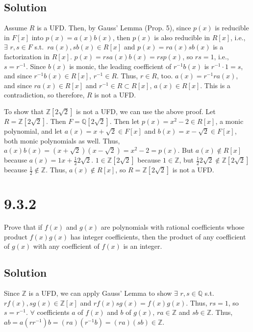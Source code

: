 \documentclass[fleqn]{article}
\begin{document}
        \subsection{Solution}
        Assume $R$ is a UFD.  Then, by Gauss' Lemma (Prop. 5), since $p(x)$ is reducible in $F[x]$ into $p(x) = a(x)b(x)$, then $p(x)$ is also reducible in $R[x]$, i.e., $\exists$ $r, s \in F$ s.t.\ $ra(x), sb(x) \in R[x]$ and $p(x) = ra(x) sb(x)$ is a factorization in $R[x]$.  $p(x) = rs a(x)b(x) = rs p(x)$, so $rs = 1$, i.e., $s = r^{-1}$.  Since $b(x)$ is monic, the leading coefficient of $r^{-1} b(x)$ is $r^{-1} \cdot 1 = s$, and since $r^{-1}b(x) \in R[x]$, $r^{-1} \in R$.  Thus, $r \in R$, too.  $a(x) = r^{-1} ra(x)$, and since $ra(x) \in R[x]$ and $r^{-1} \in R \subset R[x]$, $a(x) \in R[x]$.  This is a contradiction, so therefore, $R$ is not a UFD.
        
        To show that $\mathbb{Z}[2\sqrt{2}]$ is not a UFD, we can use the above proof.  Let $R = \mathbb{Z}[2\sqrt{2}]$.  Then $F = \mathbb{Q}\left[2\sqrt{2}\right]$.  Then let $p(x) = x^2 - 2 \in R[x]$, a monic polynomial, and let $a(x) = x + \sqrt{2} \in F[x]$ and $b(x) = x - \sqrt{2} \in F[x]$, both monic polynomials as well.  Thus, $a(x)b(x) = (x + \sqrt{2})(x - \sqrt{2}) = x^2 - 2 = p(x)$.  But $a(x) \notin R[x]$ because $a(x) = 1 x + \frac{1}{2} 2 \sqrt{2}$.  $1 \in \mathbb{Z}[2\sqrt{2}]$ because $1 \in \mathbb{Z}$, but $\frac{1}{2} 2 \sqrt{2} \notin \mathbb{Z}[2\sqrt{2}]$ because $\frac{1}{2} \notin \mathbb{Z}$.  Thus, $a(x) \notin R[x]$, so $R = \mathbb{Z}[2\sqrt{2}]$ is not a UFD.
    
    \section{9.3.2}
    Prove that if $f(x)$ and $g(x)$ are polynomials with rational coefficients whose product $f(x)g(x)$ has integer coefficients, then the product of any coefficient of $g(x)$ with any coefficient of $f(x)$ is an integer.
        
        \subsection{Solution}
        Since $\mathbb{Z}$ is a UFD, we can apply Gauss' Lemma to show $\exists$ $r, s \in \mathbb{Q}$ s.t.\ $rf(x), sg(x) \in \mathbb{Z}[x]$ and $rf(x) sg(x) = f(x)g(x)$.  Thus, $rs = 1$, so $s = r^{-1}$.  $\forall$ coefficients $a$ of $f(x)$ and $b$ of $g(x)$, $ra \in \mathbb{Z}$ and $sb \in \mathbb{Z}$.  Thus, $ab = a\left(r r^{-1}\right)b = (ra)(r^{-1}b) = (ra)(sb) \in \mathbb{Z}$.
    
\end{document}
